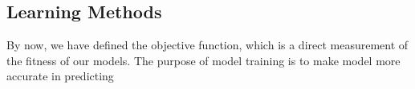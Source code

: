 \subsection {Learning Methods}
By now, we have defined the objective function, which is a direct measurement of the fitness of our models. The purpose of model training is to make model more accurate in predicting 